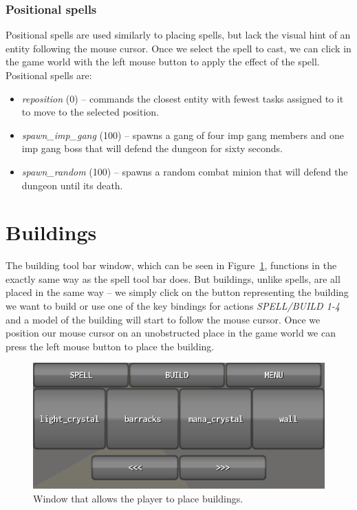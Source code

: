 \subsubsection{Positional spells}

Positional spells are used similarly to placing spells, but lack the visual hint of an entity following the mouse cursor. Once we select
the spell to cast, we can click in the game world with the left mouse button to apply the effect of the spell. Positional spells are:

\begin{itemize}
    \item \emph{reposition} (0) -- commands the closest entity with fewest tasks assigned to it to move to the selected position.
    \item \emph{spawn\_imp\_gang} (100) -- spawns a gang of four imp gang members and one imp gang boss that will defend the dungeon
        for sixty seconds.
    \item \emph{spawn\_random} (100) -- spawns a random combat minion that will defend the dungeon until its death.
\end{itemize}

\section{Buildings}

The building tool bar window, which can be seen in Figure~\ref{gui-build}, functions in the exactly same way as the spell tool bar does.
But buildings, unlike spells, are all placed in the same way -- we simply click on the button representing the building we want to build
or use one of the key bindings for actions \emph{SPELL/BUILD 1-4} and a model of the building will start to follow the mouse cursor. Once we
position our mouse cursor on an unobstructed place in the game world we can press the left mouse button to place the building.

\begin{figure}[H]
    \centering
    \includegraphics[width=\textwidth]{../img/tool-build.png}
    \caption{Window that allows the player to place buildings.}
    \label{gui-build}
\end{figure}

